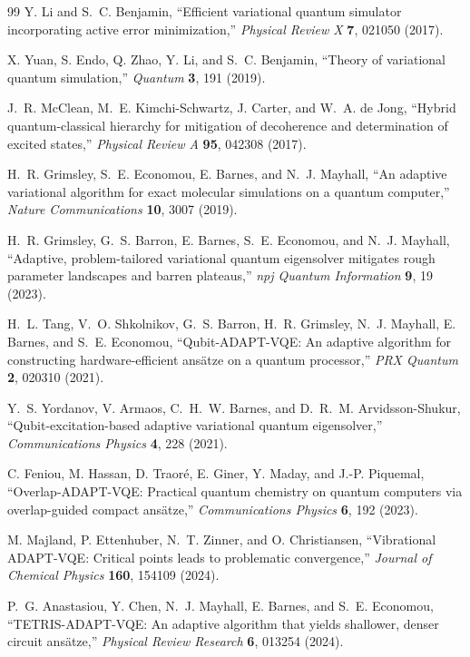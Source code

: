 \documentclass[
  reprint,
  amsmath,
  amssymb,
  aps,
  pra,
  nofootinbib,
  superscriptaddress,
  floatfix
]{revtex4-2}
\begin{document}
\begin{thebibliography}{99}
Y. Li and S.~C. Benjamin,
``Efficient variational quantum simulator incorporating active error minimization,''
\emph{Physical Review X} \textbf{7}, 021050 (2017).

X. Yuan, S. Endo, Q. Zhao, Y. Li, and S.~C. Benjamin,
``Theory of variational quantum simulation,''
\emph{Quantum} \textbf{3}, 191 (2019).

J.~R. McClean, M.~E. Kimchi-Schwartz, J. Carter, and W.~A. de Jong,
``Hybrid quantum-classical hierarchy for mitigation of decoherence and determination of excited states,''
\emph{Physical Review A} \textbf{95}, 042308 (2017).

H.~R. Grimsley, S.~E. Economou, E. Barnes, and N.~J. Mayhall,
``An adaptive variational algorithm for exact molecular simulations on a quantum computer,''
\emph{Nature Communications} \textbf{10}, 3007 (2019).

H.~R. Grimsley, G.~S. Barron, E. Barnes, S.~E. Economou, and N.~J. Mayhall,
``Adaptive, problem-tailored variational quantum eigensolver mitigates rough parameter landscapes and barren plateaus,''
\emph{npj Quantum Information} \textbf{9}, 19 (2023).

H.~L. Tang, V.~O. Shkolnikov, G.~S. Barron, H.~R. Grimsley, N.~J. Mayhall, E. Barnes, and S.~E. Economou,
``Qubit-ADAPT-VQE: An adaptive algorithm for constructing hardware-efficient ans\"atze on a quantum processor,''
\emph{PRX Quantum} \textbf{2}, 020310 (2021).

Y.~S. Yordanov, V. Armaos, C.~H.~W. Barnes, and D.~R.~M. Arvidsson-Shukur,
``Qubit-excitation-based adaptive variational quantum eigensolver,''
\emph{Communications Physics} \textbf{4}, 228 (2021).

C. Feniou, M. Hassan, D. Traor\'e, E. Giner, Y. Maday, and J.-P. Piquemal,
``Overlap-ADAPT-VQE: Practical quantum chemistry on quantum computers via overlap-guided compact ans\"atze,''
\emph{Communications Physics} \textbf{6}, 192 (2023).

M. Majland, P. Ettenhuber, N.~T. Zinner, and O. Christiansen,
``Vibrational ADAPT-VQE: Critical points leads to problematic convergence,''
\emph{Journal of Chemical Physics} \textbf{160}, 154109 (2024).

P.~G. Anastasiou, Y. Chen, N.~J. Mayhall, E. Barnes, and S.~E. Economou,
``TETRIS-ADAPT-VQE: An adaptive algorithm that yields shallower, denser circuit ans\"atze,''
\emph{Physical Review Research} \textbf{6}, 013254 (2024).


\end{thebibliography}
\end{document}
